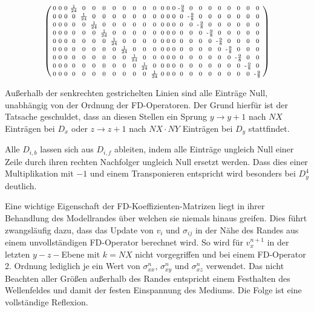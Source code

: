 \documentclass[pdftex,a4paper,parskip,listof=totoc,bibliography=totoc,onehalfspacing,12pt]{scrreprt}
\begin{document}
\begin{align*}
\begin{psmallmatrix}
0 & 0 & 0 & \frac{1}{24} & 0 & 0 & 0 & 0 & 0 & 0 & 0 & 0 & 0 & 0 & 0 & \text{-}\frac{9}{8} & 0 & 0 & 0 & 0 & 0 & 0 & 0 & 0 \\
0 & 0 & 0 & 0 & \frac{1}{24} & 0 & 0 & 0 & 0 & 0 & 0 & 0 & 0 & 0 & 0 & 0 & \text{-}\frac{9}{8} & 0 & 0 & 0 & 0 & 0 & 0 & 0 \\
0 & 0 & 0 & 0 & 0 & \frac{1}{24} & 0 & 0 & 0 & 0 & 0 & 0 & 0 & 0 & 0 & 0 & 0 & \text{-}\frac{9}{8} & 0 & 0 & 0 & 0 & 0 & 0 \\
0 & 0 & 0 & 0 & 0 & 0 & \frac{1}{24} & 0 & 0 & 0 & 0 & 0 & 0 & 0 & 0 & 0 & 0 & 0 & \text{-}\frac{9}{8} & 0 & 0 & 0 & 0 & 0 \\
0 & 0 & 0 & 0 & 0 & 0 & 0 & \frac{1}{24} & 0 & 0 & 0 & 0 & 0 & 0 & 0 & 0 & 0 & 0 & 0 & \text{-}\frac{9}{8} & 0 & 0 & 0 & 0 \\
0 & 0 & 0 & 0 & 0 & 0 & 0 & 0 & \frac{1}{24} & 0 & 0 & 0 & 0 & 0 & 0 & 0 & 0 & 0 & 0 & 0 & \text{-}\frac{9}{8} & 0 & 0 & 0 \\
0 & 0 & 0 & 0 & 0 & 0 & 0 & 0 & 0 & \frac{1}{24} & 0 & 0 & 0 & 0 & 0 & 0 & 0 & 0 & 0 & 0 & 0 & \text{-}\frac{9}{8} & 0 & 0 \\
0 & 0 & 0 & 0 & 0 & 0 & 0 & 0 & 0 & 0 & \frac{1}{24} & 0 & 0 & 0 & 0 & 0 & 0 & 0 & 0 & 0 & 0 & 0 & \text{-}\frac{9}{8} & 0 \\
0 & 0 & 0 & 0 & 0 & 0 & 0 & 0 & 0 & 0 & 0 & \frac{1}{24} & 0 & 0 & 0 & 0 & 0 & 0 & 0 & 0 & 0 & 0 & 0 & \text{-}\frac{9}{8} \\
\end{psmallmatrix}
\end{align*}

Außerhalb der senkrechten gestrichelten Linien sind alle Einträge Null, unabhängig von der Ordnung der FD-Operatoren. Der Grund hierfür ist der Tatsache geschuldet, dass an diesen Stellen ein Sprung $y\rightarrow y+1$ nach $NX$ Einträgen bei $D_{x}$ oder $z\rightarrow z+1$ nach $NX \cdot NY$ Einträgen bei $D_{y}$ stattfindet.

Alle $D_{i,b}$ lassen sich aus $D_{i,f}$ ableiten, indem alle Einträge ungleich Null einer Zeile durch ihren rechten Nachfolger ungleich Null ersetzt werden. Dass dies einer Multiplikation mit $-1$ und einem Transponieren entspricht wird besonders bei $D_{y}^4$ deutlich.


Eine wichtige Eigenschaft der FD-Koeffizienten-Matrizen liegt in ihrer Behandlung des Modellrandes über welchen sie niemals hinaus greifen. Dies führt zwangsläufig dazu, dass das Update von $v_i$ und $\sigma_{ij}$ in der Nähe des Randes aus einem unvollständigen FD-Operator berechnet wird. So wird für $v_x^{n+1}$ in der letzten $y-z-$Ebene mit $k=NX$ nicht vorgegriffen und bei einem FD-Operator 2. Ordnung lediglich je ein Wert von $\sigma_{xx}^n$, $\sigma_{xy}^n$ und $\sigma_{xz}^n$ verwendet. Das nicht Beachten aller Größen außerhalb des Randes entspricht einem Festhalten des Wellenfeldes und damit der festen Einspannung des Mediums. Die Folge ist eine vollständige Reflexion.
\end{document}
